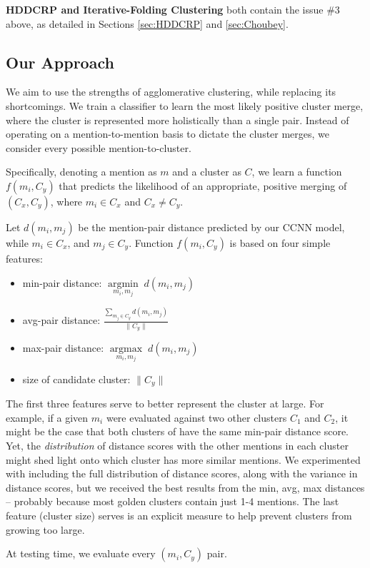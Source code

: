 \documentclass[11pt,a4paper]{article}
\newcommand{\argmin}[1]{\underset{#1}{\operatorname{argmin}}\;}
\newcommand{\argmax}[1]{\underset{#1}{\operatorname{argmax}}\;}
\begin{document}
\textbf{HDDCRP and Iterative-Folding Clustering} both contain the issue \#3 above, as detailed in Sections \ref{sec:HDDCRP} and \ref{sec:Choubey}.

\subsection{Our Approach}
We aim to use the strengths of agglomerative clustering, while replacing its shortcomings.  We train a classifier to learn the most likely {positive cluster merge}, where the cluster is represented more holistically than a single pair.  Instead of operating on a mention-to-mention basis to dictate the cluster merges, we consider every possible mention-to-cluster.

Specifically, denoting a mention as $m$ and a cluster as $C$, we learn a function $f(m_i,C_y)$ that predicts the likelihood of an appropriate, positive merging of $(C_x,C_y)$, where $m_i \in C_x$ and $C_x \neq C_y$.

Let $d(m_i,m_j)$ be the mention-pair distance predicted by our CCNN model, while $m_i \in C_x$, and $m_j \in C_y$.  Function $f(m_i,C_y)$ is based on four simple features:
\begin{itemize}
  \item min-pair distance: $\argmin{m_i,m_j} d(m_i,m_j)$
  \item avg-pair distance: $\frac{\sum_{m_j \in C_y} d(m_i,m_j)}{\|C_y\|}$
  \item max-pair distance: $\argmax{m_i,m_j} d(m_i,m_j)$
  \item size of candidate cluster: $\|C_y\|$
\end{itemize}

The first three features serve to better represent the cluster at large.  For example, if a given $m_i$ were evaluated against two other clusters $C_1$ and $C_2$, it might be the case that both clusters of have the same min-pair distance score.  Yet, the \textit{distribution} of distance scores with the other mentions in each cluster might shed light onto which cluster has more similar mentions.  We experimented with including the full distribution of distance scores, along with the variance in distance scores, but we received the best results from the min, avg, max distances -- probably because most golden clusters contain just 1-4 mentions.  The last feature (cluster size) serves is an explicit measure to help prevent clusters from growing too large.

At testing time, we evaluate every $(m_i, C_y)$ pair.  
\end{document}
